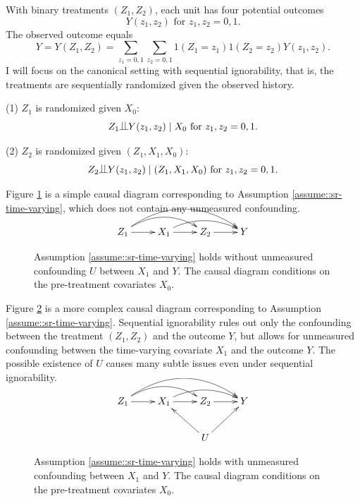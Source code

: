 With binary treatments $(Z_1, Z_2 )$, each unit has four potential outcomes 
$$
Y(z_1, z_2)  \text{ for } z_1, z_2  = 0, 1.
$$ 
The observed outcome equals 
$$
Y = Y(Z_1,Z_2) = \sum_{z_1=0,1} \sum_{z_2=0,1}  1(Z_1=z_1) 1(Z_2=z_2) Y(z_1, z_2).
$$
I will focus on the canonical setting with sequential ignorability, that is, the treatments are sequentially randomized given the observed history.

\begin{assumption}
\label{assume::sr-time-varying} 
(1)
$Z_1$ is randomized given $X_0$:
$$
Z_1 \ind Y(z_1, z_2) \mid X_0 \text{ for } z_1, z_2  = 0, 1.
$$

(2)
$Z_2$ is randomized given $( Z_1, X_1, X_0)$:
$$
Z_2\ind Y(z_1, z_2) \mid (Z_1, X_1, X_0) \text{ for } z_1, z_2  = 0, 1.
$$
\end{assumption}
 
 
 Figure \ref{fig::si-simple} is a simple causal diagram corresponding to Assumption  \ref{assume::sr-time-varying}, which does not contain any unmeasured confounding. 
 
\begin{figure}
\bigskip 
$$
 \xymatrix{
 Z_1 \ar[r]  \ar@/^1.3pc/[rr]  \ar@/^2.0pc/[rrr] & X_1  \ar@/^1pc/[rr]\ar[r]  & Z_2  \ar[r] & Y
 }
 $$
 \caption{Assumption  \ref{assume::sr-time-varying} holds without unmeasured confounding $U$ between $X_1$ and $Y$. The causal diagram conditions on the pre-treatment covariates $X_0$.}\label{fig::si-simple}
\end{figure}



  Figure \ref{fig::si-complex} is a more complex causal diagram corresponding to Assumption  \ref{assume::sr-time-varying}. Sequential ignorability rules out only the confounding between the treatment $( Z_1, Z_2) $ and the outcome $Y$, but allows for unmeasured confounding between the time-varying covariate $X_1$ and the outcome $Y$.
  The possible existence of $U$ causes many subtle issues even under sequential ignorability. 

\begin{figure}
\bigskip 
$$
 \xymatrix{
 Z_1 \ar[r] \ar@/^1.3pc/[rr] \ar@/^2.0pc/[rrr] & X_1  \ar@/^1pc/[rr]\ar[r]  & Z_2  \ar[r] & Y \\
                                             &                                             &U\ar[lu]\ar[ru]
 }
 $$
 \caption{Assumption  \ref{assume::sr-time-varying} holds with unmeasured confounding between $X_1$ and $Y$. The causal diagram conditions on the pre-treatment covariates $X_0$.}\label{fig::si-complex}
\end{figure}



